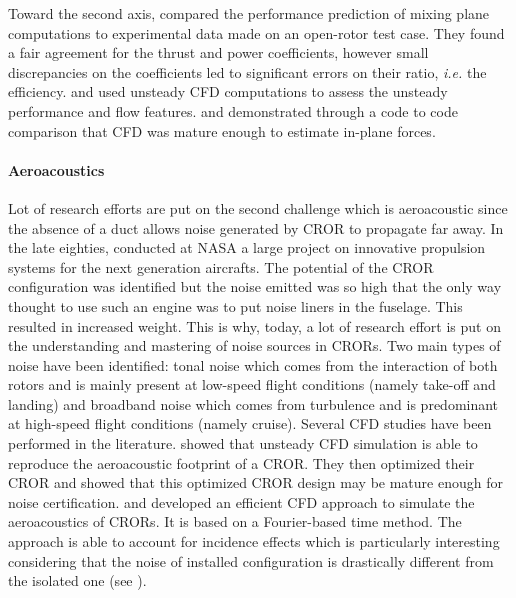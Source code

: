 Toward the second axis, \citet{Zachariadis2011}
compared the performance prediction of mixing plane computations
to experimental data made on an open-rotor test case.
They found a fair agreement for the thrust and power coefficients, however
small discrepancies on the coefficients led to significant errors on their ratio,
\emph{i.e.} the efficiency.
\citet{Vion2011} and \citet{Stuermer2008} used unsteady
CFD computations to assess the unsteady performance and flow features.
\citet{Stuermer2008} and \citet{Francois2013} demonstrated through a code to code comparison
that CFD was mature enough to estimate in-plane forces.

\paragraph{Aeroacoustics}
Lot of research efforts are put on the second challenge which
is aeroacoustic since the absence of a duct allows noise generated
by CROR to propagate far away.
In the late eighties, \citet{Hager1988}
conducted at NASA a large project on innovative propulsion systems for the
next generation aircrafts. The potential of the CROR configuration
was identified but the noise emitted was so high that the only way
thought to use such an engine was to put noise liners in the fuselage. This resulted in 
increased weight. This is why, today, a lot of research effort is put on the
understanding and mastering of noise sources in CRORs.
Two main types of noise have been identified: tonal noise which comes from
the interaction of both rotors and is mainly present at low-speed flight conditions 
(namely take-off and landing)
and broadband noise which comes from turbulence and is predominant
at high-speed flight conditions (namely cruise).
Several CFD studies have been performed in the literature.
\citet{Peters2012} showed that unsteady CFD simulation is able
to reproduce the aeroacoustic footprint of a CROR. They then optimized
their CROR and showed that this optimized CROR design may be mature enough
for noise certification. \citet{Hoffer2012} and \citet{Ferrante2013}
developed an efficient CFD approach to simulate the aeroacoustics of CRORs.
It is based on a Fourier-based time method. The approach is able to
account for incidence effects which is particularly interesting
considering that the noise of installed configuration is drastically
different from the isolated one (see \citet{Hager1988}).

